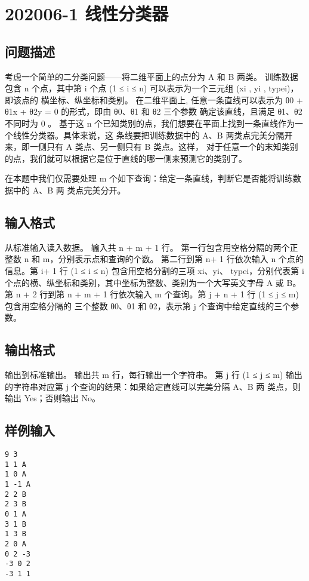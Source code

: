 \section{202006-1 线性分类器}

\subsection{问题描述}

考虑一个简单的二分类问题——将二维平面上的点分为 A 和 B 两类。
训练数据包含 n 个点，其中第 i 个点 (1 ≤ i ≤ n) 可以表示为一个三元组 (xi
, yi
, typei)，即该点的
横坐标、纵坐标和类别。
在二维平面上, 任意一条直线可以表示为 θ0 + θ1x + θ2y = 0 的形式，即由 θ0、θ1 和 θ2 三个参数
确定该直线，且满足 θ1、θ2 不同时为 0 。
基于这 n 个已知类别的点，我们想要在平面上找到一条直线作为一个线性分类器。具体来说，这
条线要把训练数据中的 A、B 两类点完美分隔开来，即一侧只有 A 类点、另一侧只有 B 类点。这样，
对于任意一个的末知类别的点，我们就可以根据它是位于直线的哪一侧来预测它的类别了。

在本题中我们仅需要处理 m 个如下查询：给定一条直线，判断它是否能将训练数据中的 A、B 两
类点完美分开。
\subsection{输入格式}

从标准输入读入数据。
输入共 n + m + 1 行。
第一行包含用空格分隔的两个正整数 n 和 m，分别表示点和查询的个数。
第二行到第 n+ 1 行依次输入 n 个点的信息。第 i+ 1 行 (1 ≤ i ≤ n) 包含用空格分割的三项 xi、yi、
typei，分别代表第 i 个点的横、纵坐标和类别，其中坐标为整数、类别为一个大写英文字母 A 或 B。
第 n + 2 行到第 n + m + 1 行依次输入 m 个查询。第 j + n + 1 行 (1 ≤ j ≤ m) 包含用空格分隔的
三个整数 θ0、θ1 和 θ2，表示第 j 个查询中给定直线的三个参数。

\subsection{输出格式}

输出到标准输出。
输出共 m 行，每行输出一个字符串。
第 j 行 (1 ≤ j ≤ m) 输出的字符串对应第 j 个查询的结果：如果给定直线可以完美分隔 A、B 两
类点，则输出 Yes；否则输出 No。

\subsection{样例输入}

\begin{lstlisting}[numbers=none]
9 3
1 1 A
1 0 A
1 -1 A
2 2 B
2 3 B
0 1 A
3 1 B
1 3 B
2 0 A
0 2 -3
-3 0 2
-3 1 1
\end{lstlisting}

